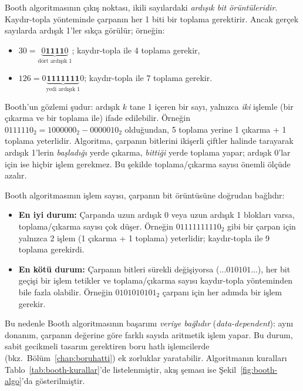 Booth algoritmasının çıkış noktası, ikili sayılardaki \emph{ardışık bit örüntüleridir}. Kaydır-topla yönteminde çarpanın her 1 biti bir toplama gerektirir. Ancak gerçek sayılarda ardışık 1'ler sıkça görülür; örneğin:
%
\begin{itemize}[nosep]
\item $30 = \underbrace{0\textbf{1111}0}_{\text{dört ardışık 1}}$; kaydır-topla ile 4 toplama gerekir,
\item $126 = 0\underbrace{\textbf{1111111}}_{\text{yedi ardışık 1}}0$; kaydır-topla ile 7 toplama gerekir.
\end{itemize}
%
Booth'un gözlemi şudur: ardışık $k$ tane 1 içeren bir sayı, yalnızca \emph{iki} işlemle (bir çıkarma ve bir toplama ile) ifade edilebilir. Örneğin $0111110_2 = 1000000_2 - 0000010_2$ olduğundan, 5 toplama yerine 1 çıkarma + 1 toplama yeterlidir. Algoritma, çarpanın bitlerini ikişerli çiftler halinde tarayarak ardışık 1'lerin \emph{başladığı} yerde çıkarma, \emph{bittiği} yerde toplama yapar; ardışık 0'lar için ise hiçbir işlem gerekmez. Bu şekilde toplama/çıkarma sayısı önemli ölçüde azalır.

Booth algoritmasının işlem sayısı, çarpanın bit örüntüsüne doğrudan bağlıdır:
%
\begin{itemize}[nosep]
\item \textbf{En iyi durum:} Çarpanda uzun ardışık 0 veya uzun ardışık 1 blokları varsa, toplama/çıkarma sayısı çok düşer. Örneğin $01111111110_2$ gibi bir çarpan için yalnızca 2 işlem (1 çıkarma + 1 toplama) yeterlidir; kaydır-topla ile 9 toplama gerekirdi.
\item \textbf{En kötü durum:} Çarpanın bitleri sürekli değişiyorsa ($\ldots 010101 \ldots$), her bit geçişi bir işlem tetikler ve toplama/çıkarma sayısı kaydır-topla yönteminden bile fazla olabilir. Örneğin $0101010101_2$ çarpanı için her adımda bir işlem gerekir.
\end{itemize}
%
Bu nedenle Booth algoritmasının başarımı \emph{veriye bağlıdır} (\emph{data-dependent}): aynı donanım, çarpanın değerine göre farklı sayıda aritmetik işlem yapar. Bu durum, sabit gecikmeli tasarım gerektiren boru hatlı işlemcilerde (bkz.\ Bölüm~\ref{chap:boruhatti}) ek zorluklar yaratabilir. Algoritmanın kuralları Tablo~\ref{tab:booth-kurallar}'de listelenmiştir, akış şeması ise Şekil~\ref{fig:booth-algo}'da gösterilmiştir.

